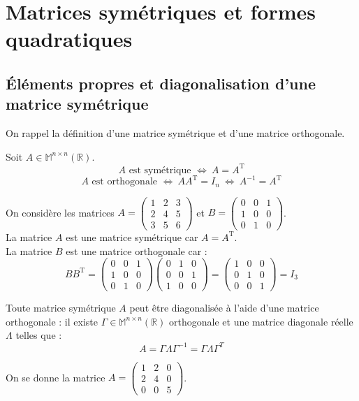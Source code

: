 \section{Matrices symétriques et formes quadratiques}
\subsection{Éléments propres et diagonalisation d'une matrice symétrique}
On rappel la définition d'une matrice symétrique et d'une matrice orthogonale.
\begin{defi}
Soit $A\in\mathbb{M}^{n\times n}(\mathbb{R})$.\
$$A\text{ est symétrique }\Leftrightarrow\ A=A^{\text{T}}$$
$$A\text{ est orthogonale }\Leftrightarrow\ AA^{\text{T}}=I_n\ \Leftrightarrow\ A^{-1}=A^{\text{T}}$$
\end{defi}
\begin{ex}
On considère les matrices $A=\begin{pmatrix}1&2&3\\2&4&5\\3&5&6\end{pmatrix}$ et $B=\begin{pmatrix}0&0&1\\1&0&0\\0&1&0\end{pmatrix}$.\\
La matrice $A$ est une matrice symétrique car $A=A^{\text{T}}$.\\
La matrice $B$ est une matrice orthogonale car :
$$BB^{\text{T}}=\begin{pmatrix}0&0&1\\1&0&0\\0&1&0\end{pmatrix}\begin{pmatrix}0&1&0\\0&0&1\\1&0&0\end{pmatrix}=\begin{pmatrix}1&0&0\\0&1&0\\0&0&1\end{pmatrix}=I_3$$
\end{ex}
\begin{thm}
Toute matrice symétrique $A$ peut être diagonalisée à l'aide d'une matrice orthogonale : il existe $\Gamma\in\mathbb{M}^{n\times n}(\mathbb{R})$ orthogonale et une matrice diagonale réelle $\Lambda$ telles que :
$$A=\Gamma\Lambda\Gamma^{-1}=\Gamma\Lambda\Gamma^{T}$$
\end{thm}
\begin{ex}
On se donne la matrice $A=\begin{pmatrix}1&2&0\\2&4&0\\0&0&5\end{pmatrix}$.
\end{ex}
